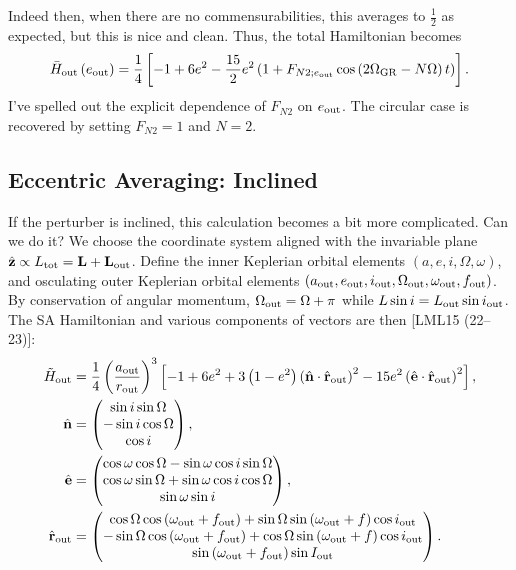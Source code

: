 \documentclass[10pt,
        usenames, %
        dvipsnames %
    ]{article}
\newcommand*{\bm}[1]{\boldsymbol{\mathbf{#1}}}
\newcommand*{\uv}[1]{\hat{\bm{#1}}}
\newcommand*{\p}[1]{\left(#1\right)}
\newcommand*{\s}[1]{\left[#1\right]}
\begin{document}
Indeed then, when there are no commensurabilities, this averages to
$\frac{1}{2}$ as expected, but this is nice and clean. Thus, the total
Hamiltonian becomes
\begin{equation}
    \bar{H}_{\rm out}\p{e_{\rm out}} = \frac{1}{4}\s{-1 + 6e^2 - \frac{15}{2}e^2
        \p{1 + F_{N2;e_{\rm out}}\cos\p{2\Omega_{\rm GR} - N\Omega}t}}.
\end{equation}
I've spelled out the explicit dependence of $F_{N2}$ on $e_{\rm out}$. The
circular case is recovered by setting $F_{N2} = 1$ and $N = 2$.

\subsection{Eccentric Averaging: Inclined}

If the perturber is inclined, this calculation becomes a bit more complicated.
Can we do it? We choose the coordinate system aligned with the invariable plane
$\uv{z} \propto L_{\rm tot} = \bm{L} + \bm{L}_{\rm out}$. Define the inner
Keplerian orbital elements $\p{a, e, i, \Omega, \omega}$, and osculating outer
Keplerian orbital elements $\p{a_{\rm out}, e_{\rm out}, i_{\rm out},
\Omega_{\rm out}, \omega_{\rm out}, f_{\rm out}}$. By conservation of angular
momentum, $\Omega_{\rm out} = \Omega + \pi$ while $L\sin i = L_{\rm out} \sin
i_{\rm out}$. The SA Hamiltonian and various components of vectors are then
[LML15 (22--23)]:
\begin{align}
    \tilde{H}_{\rm out}
        &= \frac{1}{4}\p{\frac{a_{\rm out}}{r_{\rm out}}}^3 \s{
            -1 + 6e^2 + 3\p{1 - e^2}\p{\uv{n} \cdot \uv{r}_{\rm out}}^2
            - 15 e^2\p{\uv{e} \cdot \uv{r}_{\rm out}}^2},\\
    \uv{n} &= \begin{pmatrix}
        \sin i \sin \Omega\\
        -\sin i \cos \Omega\\
        \cos i
    \end{pmatrix},\\
    \uv{e} &= \begin{pmatrix}
        \cos \omega \cos \Omega - \sin \omega \cos i \sin \Omega\\
        \cos \omega \sin \Omega + \sin \omega \cos i \cos \Omega\\
        \sin \omega \sin i
    \end{pmatrix},\\
    \uv{r}_{\rm out} &= \begin{pmatrix}
        \cos \Omega\cos\p{\omega_{\rm out} + f_{\rm out}}
            + \sin \Omega\sin\p{\omega_{\rm out} + f}\cos i_{\rm out}
            \\
        -\sin \Omega\cos\p{\omega_{\rm out} + f_{\rm out}}
            + \cos \Omega\sin\p{\omega_{\rm out} + f}\cos i_{\rm out}
            \\
        \sin\p{\omega_{\rm out} + f_{\rm out}}\sin I_{\rm out}
    \end{pmatrix}.
\end{align}
\end{document}
